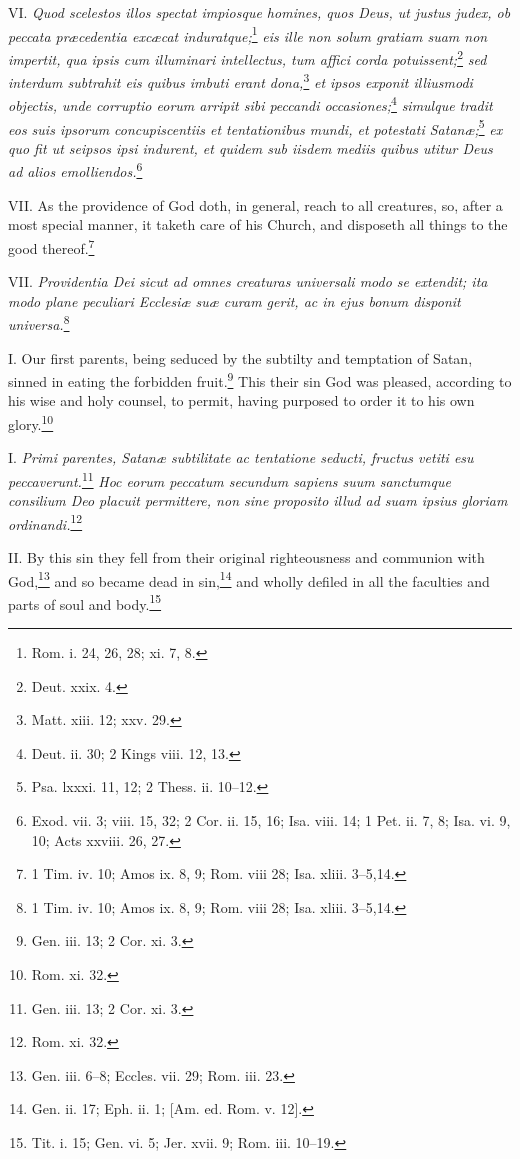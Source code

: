 VI. \emph{Quod scelestos illos spectat impiosque homines, quos Deus, ut justus judex, ob peccata præcedentia excæcat induratque;}\footnote{Rom. i. 24, 26, 28; xi. 7, 8.}\emph{ eis ille non solum gratiam suam non impertit, qua ipsis cum illuminari intellectus, tum affici corda potuissent;}\footnote{Deut. xxix. 4.}\emph{ sed interdum subtrahit eis quibus imbuti erant dona,}\footnote{Matt. xiii. 12; xxv. 29.}\emph{ et ipsos exponit illiusmodi objectis, unde corruptio eorum arripit sibi peccandi occasiones;}\footnote{Deut. ii. 30; 2 Kings viii. 12, 13.}\emph{ simulque tradit eos suis ipsorum concupiscentiis et tentationibus mundi, et potestati Satanæ;}\footnote{Psa. lxxxi. 11, 12; 2 Thess. ii. 10–12.}\emph{ ex quo fit ut seipsos ipsi indurent, et quidem sub iisdem mediis quibus utitur Deus ad alios emolliendos.}\footnote{Exod. vii. 3; viii. 15, 32; 2 Cor. ii. 15, 16; Isa. viii. 14; 1 Pet. ii. 7, 8; Isa. vi. 9, 10; Acts xxviii. 26, 27.}

VII. As the providence of God doth, in general, reach to all creatures, so, after a most special manner, it taketh care of his Church, and disposeth all things to the good thereof.\footnote{1 Tim. iv. 10; Amos ix. 8, 9; Rom. viii 28; Isa. xliii. 3–5,14.}

VII. \emph{Providentia Dei sicut ad omnes creaturas universali modo se extendit; ita modo plane peculiari Ecclesiæ suæ curam gerit, ac in ejus bonum disponit universa.}\footnote{1 Tim. iv. 10; Amos ix. 8, 9; Rom. viii 28; Isa. xliii. 3–5,14.}


I. Our first parents, being seduced by the subtilty and temptation of Satan, sinned in eating the forbidden fruit.\footnote{Gen. iii. 13; 2 Cor. xi. 3.} This their sin God was pleased, according to his wise and holy counsel, to permit, having purposed to order it to his own glory.\footnote{Rom. xi. 32.}

I. \emph{Primi parentes, Satanæ subtilitate ac tentatione seducti, fructus vetiti esu peccaverunt.}\footnote{Gen. iii. 13; 2 Cor. xi. 3.}\emph{ Hoc eorum peccatum secundum sapiens suum sanctumque consilium Deo placuit permittere, non sine proposito illud ad suam ipsius gloriam ordinandi.}\footnote{Rom. xi. 32.}

II. By this sin they fell from their original righteousness and communion with God,\footnote{Gen. iii. 6–8; Eccles. vii. 29; Rom. iii. 23.} and so became dead in sin,\footnote{Gen. ii. 17; Eph. ii. 1; [Am. ed. Rom. v. 12].} and wholly defiled in all the faculties and parts of soul and body.\footnote{Tit. i. 15; Gen. vi. 5; Jer. xvii. 9; Rom. iii. 10–19.}

